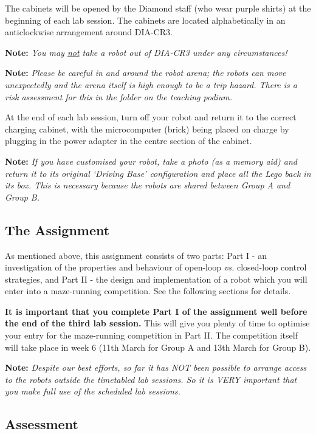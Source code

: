 \documentclass[hidelinks,a4paper,11pt]{article}
\begin{document}
The cabinets will be opened by the Diamond staff (who wear purple shirts) at the beginning of each lab session.  The cabinets are located alphabetically in an anticlockwise arrangement around DIA-CR3.

{\bfseries Note:}  \emph{You may \underline{not} take a robot out of DIA-CR3 under any circumstances!}

{\bfseries Note:}  \emph{Please be careful in and around the robot arena; the robots can move unexpectedly and the arena itself is high enough to be a trip hazard.  There is a risk assessment for this in the folder on the teaching podium.}

At the end of each lab session, turn off your robot and return it to the correct charging cabinet, with the microcomputer (brick) being placed on charge by plugging in the power adapter in the centre section of the cabinet.

{\bfseries Note:}  \emph{If you have customised your robot, take a photo (as a memory aid) and return it to its original `Driving Base' configuration and place all the Lego back in its box.  This is necessary because the robots are shared between Group A and Group B.}


\subsection{The Assignment}

As mentioned above, this assignment consists of two parts: Part I - an investigation of the properties and behaviour of open-loop \emph{vs.} closed-loop control strategies, and Part II - the design and implementation of a robot which you will enter into a maze-running competition.  See the following sections for details.

\textbf{It is important that you complete Part I of the assignment well before the end of the third lab session.}  This will give you plenty of time to optimise your entry for the maze-running competition in Part II.  The competition itself will take place in week 6 (11th March for Group A and 13th March for Group B).

{\bfseries Note:}  \emph{Despite our best efforts, so far it has NOT been possible to arrange access to the robots outside the timetabled lab sessions.  So it is VERY important that you make full use of the scheduled lab sessions.}


\subsection{Assessment}
\end{document}
